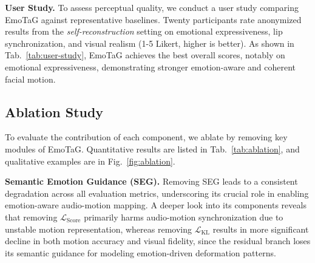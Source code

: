 \begin{table}[t]
\centering
\small
{}
\vspace{-5pt}
\caption{
\textbf{User study on emotional expressiveness, lip synchronization, and visual realism.} 
Ratings range from 1 to 5, where higher indicates better performance. 
[Key: \textbf{Best}, \underline{Second Best}]}
\vspace{-10pt}
\label{tab:user-study}
\end{table}

\noindent \textbf{User Study.}
To assess perceptual quality, we conduct a user study comparing EmoTaG against representative baselines.
Twenty participants rate anonymized results from the \textit{self-reconstruction} setting on emotional expressiveness, lip synchronization, and visual realism (1-5 Likert, higher is better).
As shown in Tab.~\ref{tab:user-study}, EmoTaG achieves the best overall scores, notably on emotional expressiveness, demonstrating stronger emotion-aware and coherent facial motion.


\subsection{Ablation Study}
To evaluate the contribution of each component, we ablate by removing key modules of EmoTaG. Quantitative results are listed in Tab.~\ref{tab:ablation}, and qualitative examples are in Fig.~\ref{fig:ablation}.  

\noindent \textbf{Semantic Emotion Guidance (SEG).}  
Removing SEG leads to a consistent degradation across all evaluation metrics, underscoring its crucial role in enabling emotion-aware audio-motion mapping.
A deeper look into its components reveals that removing $\mathcal{L}_{\text{Score}}$ primarily harms audio-motion synchronization due to unstable motion representation, whereas removing $\mathcal{L}_{\text{KL}}$ results in more significant decline in both motion accuracy and visual fidelity, since the residual branch loses its semantic guidance for modeling emotion-driven deformation patterns. 

